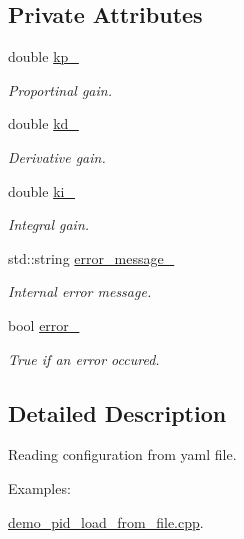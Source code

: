 \subsection*{Private Attributes}
\begin{DoxyCompactItemize}
\item 
double \hyperlink{classci__example__cpp_1_1File__configuration_a919075c40e92692f39cb26d99d6c40a9}{kp\+\_\+}
\begin{DoxyCompactList}\small\item\em Proportinal gain. \end{DoxyCompactList}\item 
double \hyperlink{classci__example__cpp_1_1File__configuration_aabec4cb5a29a53e469be722cf2f47fbf}{kd\+\_\+}
\begin{DoxyCompactList}\small\item\em Derivative gain. \end{DoxyCompactList}\item 
double \hyperlink{classci__example__cpp_1_1File__configuration_ae819105d7a538cb7f604824a10f8b814}{ki\+\_\+}
\begin{DoxyCompactList}\small\item\em Integral gain. \end{DoxyCompactList}\item 
std\+::string \hyperlink{classci__example__cpp_1_1File__configuration_aabc2359549686784a62fae2130f1aae7}{error\+\_\+message\+\_\+}
\begin{DoxyCompactList}\small\item\em Internal error message. \end{DoxyCompactList}\item 
bool \hyperlink{classci__example__cpp_1_1File__configuration_a838d95dfb9f01ea950cd67f4c7320eff}{error\+\_\+}
\begin{DoxyCompactList}\small\item\em True if an error occured. \end{DoxyCompactList}\end{DoxyCompactItemize}


\subsection{Detailed Description}
Reading configuration from yaml file. \begin{Desc}
\item[Examples\+: ]\par
\hyperlink{demo_pid_load_from_file_8cpp-example}{demo\+\_\+pid\+\_\+load\+\_\+from\+\_\+file.\+cpp}.\end{Desc}


